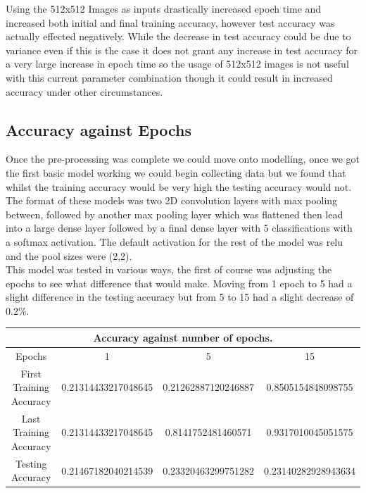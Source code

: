 Using the 512x512 Images as inputs drastically increased epoch time and increased both initial and final training accuracy, however test accuracy was actually effected negatively. While the decrease in test accuracy could be due to variance even if this is the case it does not grant any increase in test accuracy for a very large increase in epoch time so the usage of 512x512 images is not useful with this current parameter combination though it could result in increased accuracy under other circumstances. \\

\subsection{Accuracy against Epochs}

Once the pre-processing was complete we could move onto modelling, once we got the first basic model working we could begin collecting data but we found that whilst the training accuracy would be very high the testing accuracy would not. The format of these models was two 2D convolution layers with max pooling between, followed by another max pooling layer which was flattened then lead into a large dense layer followed by a final dense layer with 5 classifications with a softmax activation. The default activation for the rest of the model was relu and the pool sizes were (2,2). \\

This model was tested in various ways, the first of course was adjusting the epochs to see what difference that would make. Moving from 1 epoch to 5 had a slight difference in the testing accuracy but from 5 to 15 had a slight decrease of 0.2\%. \\

\begin{table}[H]
\begin{center}
 \footnotesize
 \begin{tabular}{|c||c|c|c|}
 \hline
 \multicolumn{4}{|c|}{Accuracy against number of epochs.} \\
 \hline
 Epochs & 1 & 5 & 15 \\
 \hline \hline
 First Training Accuracy & 0.21314433217048645 & 0.21262887120246887 & 0.8505154848098755 \\
 \hline
 Last Training Accuracy & 0.21314433217048645 & 0.8141752481460571 & 0.9317010045051575 \\
 \hline
 Testing Accuracy & 0.21467182040214539	& 0.23320463299751282	& 0.23140282928943634 \\
 \hline
 \end{tabular} \\
\end{center}
\end{table}

